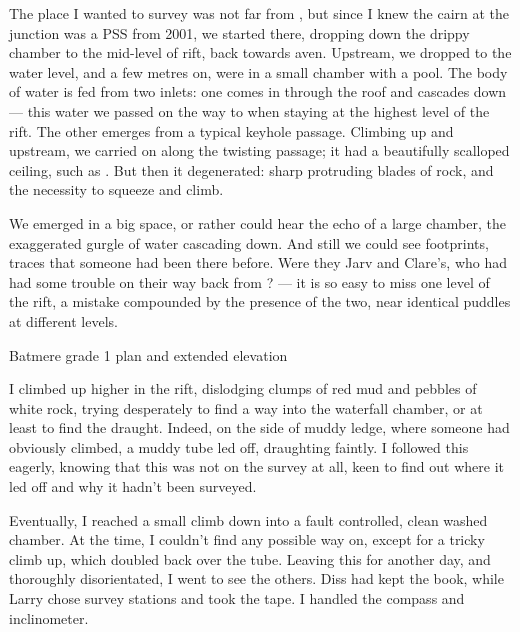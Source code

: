 	The place I wanted to survey was not far from , but since I knew the cairn at the junction was a PSS from 2001, we started there, dropping down the drippy chamber to the mid-level of rift, back towards  aven. Upstream, we dropped to the water level, and a few metres on, were in a small chamber with a pool. The body of water is fed from two inlets: one comes in through the roof and cascades down --- this water we passed on the way to  when staying at the highest level of the rift. The other emerges from a typical keyhole passage. Climbing up and upstream, we carried on along the twisting passage; it had a beautifully scalloped ceiling, such as . But then it degenerated: sharp protruding blades of rock, and the necessity to squeeze and climb. 
	
	We emerged in a big space, or rather could hear the echo of a large chamber, the exaggerated gurgle of water cascading down. And still we could see footprints, traces that someone had been there before. Were they Jarv and Clare's, who had had some trouble on their way back from ? --- it is so easy to miss one level of the rift, a mistake compounded by the presence of the two, near identical puddles at different levels. 
	
\begin{survey}[b!]
\checkoddpage \ifoddpage \forcerectofloat \else \forceversofloat \fi
 \centering
{}
\caption[Batmere plan and (grade 1)]{Batmere grade 1 plan and extended elevation }
\end{survey}

	
	I climbed up higher in the rift, dislodging clumps of red mud and pebbles of white rock, trying desperately to find a way into the waterfall chamber, or at least to find the draught. Indeed, on the side of muddy ledge, where someone had obviously climbed, a muddy tube led off, draughting faintly. I followed this eagerly, knowing that this was not on the survey at all, keen to find out where it led off and why it hadn't been surveyed. 

	Eventually, I reached a small climb down into a fault controlled, clean washed chamber. At the time, I couldn't find any possible way on, except for a tricky climb up, which doubled back over the tube. Leaving this for another day, and thoroughly disorientated, I went to see the others. Diss had kept the book, while Larry chose survey stations and took the tape. I handled the compass and inclinometer. 
	

